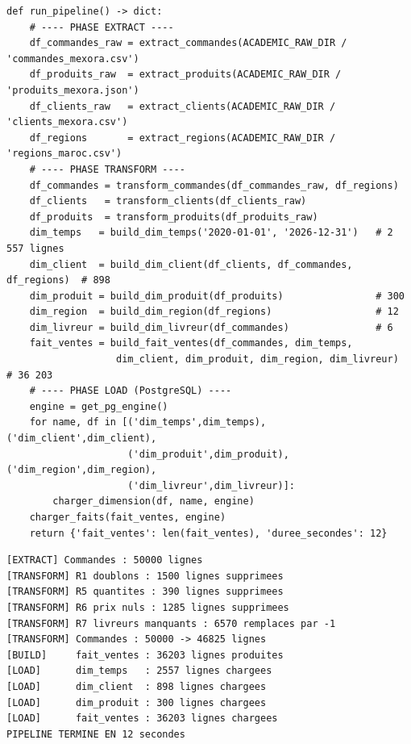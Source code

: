 \documentclass[12pt,a4paper]{article}
\begin{document}
\begin{lstlisting}[style=python, caption=Orchestration complete du pipeline (main.py)]
def run_pipeline() -> dict:
    # ---- PHASE EXTRACT ----
    df_commandes_raw = extract_commandes(ACADEMIC_RAW_DIR / 'commandes_mexora.csv')
    df_produits_raw  = extract_produits(ACADEMIC_RAW_DIR / 'produits_mexora.json')
    df_clients_raw   = extract_clients(ACADEMIC_RAW_DIR / 'clients_mexora.csv')
    df_regions       = extract_regions(ACADEMIC_RAW_DIR / 'regions_maroc.csv')
    # ---- PHASE TRANSFORM ----
    df_commandes = transform_commandes(df_commandes_raw, df_regions)
    df_clients   = transform_clients(df_clients_raw)
    df_produits  = transform_produits(df_produits_raw)
    dim_temps   = build_dim_temps('2020-01-01', '2026-12-31')   # 2 557 lignes
    dim_client  = build_dim_client(df_clients, df_commandes, df_regions)  # 898
    dim_produit = build_dim_produit(df_produits)                # 300
    dim_region  = build_dim_region(df_regions)                  # 12
    dim_livreur = build_dim_livreur(df_commandes)               # 6
    fait_ventes = build_fait_ventes(df_commandes, dim_temps,
                   dim_client, dim_produit, dim_region, dim_livreur)  # 36 203
    # ---- PHASE LOAD (PostgreSQL) ----
    engine = get_pg_engine()
    for name, df in [('dim_temps',dim_temps),('dim_client',dim_client),
                     ('dim_produit',dim_produit),('dim_region',dim_region),
                     ('dim_livreur',dim_livreur)]:
        charger_dimension(df, name, engine)
    charger_faits(fait_ventes, engine)
    return {'fait_ventes': len(fait_ventes), 'duree_secondes': 12}
\end{lstlisting}

\begin{successbox}[title=Log de sortie -- execution validee (12 secondes)]
\begin{verbatim}
[EXTRACT] Commandes : 50000 lignes
[TRANSFORM] R1 doublons : 1500 lignes supprimees
[TRANSFORM] R5 quantites : 390 lignes supprimees
[TRANSFORM] R6 prix nuls : 1285 lignes supprimees
[TRANSFORM] R7 livreurs manquants : 6570 remplaces par -1
[TRANSFORM] Commandes : 50000 -> 46825 lignes
[BUILD]     fait_ventes : 36203 lignes produites
[LOAD]      dim_temps   : 2557 lignes chargees
[LOAD]      dim_client  : 898 lignes chargees
[LOAD]      dim_produit : 300 lignes chargees
[LOAD]      fait_ventes : 36203 lignes chargees
PIPELINE TERMINE EN 12 secondes
\end{verbatim}
\end{successbox}
\end{document}
